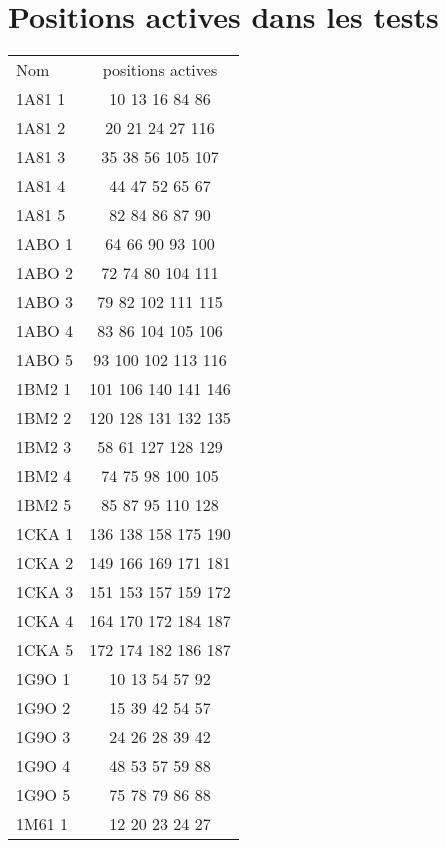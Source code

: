 \chapter*{Positions actives dans les tests}
\label{chap:annexe}

    \begin{table}[!htbp]
      \centering

      \begin{tabular}{lc}

        \toprule
        Nom & positions actives \\
        \cmidrule{1-2}
        1A81 1 & 10 13 16 84 86 \\
        1A81 2 & 20 21 24 27 116 \\
        1A81 3 & 35 38 56 105 107 \\
        1A81 4 & 44 47 52 65 67 \\
        1A81 5 & 82 84 86 87 90 \\
        1ABO 1 & 64 66 90 93 100 \\
        1ABO 2 & 72 74 80 104 111 \\
        1ABO 3 & 79 82 102 111 115 \\
        1ABO 4 & 83 86 104 105 106 \\
        1ABO 5 & 93 100 102 113 116 \\
        1BM2 1 & 101 106 140 141 146 \\
        1BM2 2 & 120 128 131 132 135 \\
        1BM2 3 & 58 61 127 128 129 \\
        1BM2 4 & 74 75 98 100 105 \\
        1BM2 5 & 85 87 95 110 128 \\
        1CKA 1 & 136 138 158 175 190 \\
        1CKA 2 & 149 166 169 171 181 \\
        1CKA 3 & 151 153 157 159 172 \\
        1CKA 4 & 164 170 172 184 187 \\
        1CKA 5 & 172 174 182 186 187 \\
        1G9O 1 & 10 13 54 57 92 \\
        1G9O 2 & 15 39 42 54 57 \\
        1G9O 3 & 24 26 28 39 42 \\
        1G9O 4 & 48 53 57 59 88 \\
        1G9O 5 & 75 78 79 86 88 \\
        1M61 1 & 12 20 23 24 27 \\

\end{tabular}
\end{table}
